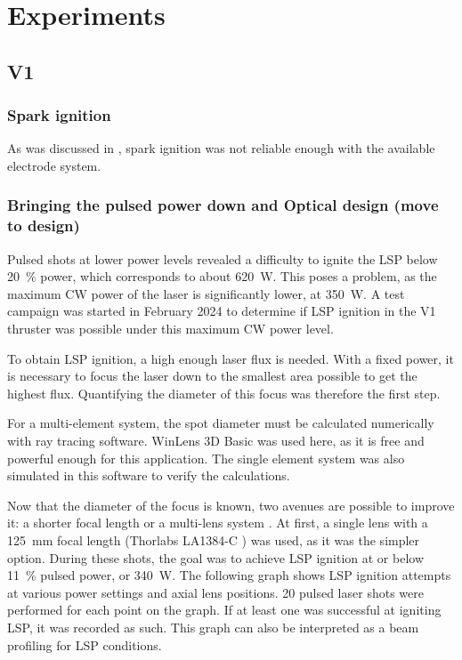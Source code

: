 \chapter{Experiments}

    \section{V1}

        \subsection{Spark ignition}
            
            As was discussed in \cite{duplayArgonLaserPlasmaThruster2024a}, spark ignition was not reliable enough with the available electrode system. 

        \subsection{Bringing the pulsed power down and Optical design (move to design)} \label{sec:design_optics}
            
            Pulsed shots at lower power levels revealed a difficulty to ignite the LSP below \qty{20}{\%} power, which corresponds to about \qty{620}{W}. This poses a problem, as the maximum CW power of the laser is significantly lower, at \qty{350}{W}. A test campaign was started in February 2024 to determine if LSP ignition in the V1 thruster was possible under this maximum CW power level.
            
            To obtain LSP ignition, a high enough laser flux is needed. With a fixed power, it is necessary to focus the laser down to the smallest area possible to get the highest flux. Quantifying the diameter of this focus was therefore the first step. 


            For a multi-element system, the spot diameter must be calculated numerically with ray tracing software. WinLens 3D Basic \cite{winlens} was used here, as it is free and powerful enough for this application. The single element system was also simulated in this software to verify the calculations.

            Now that the diameter of the focus is known, two avenues are possible to improve it: a shorter focal length or a multi-lens system \cite{thorlabs}. At first, a single lens with a \qty{125}{mm} focal length (Thorlabs LA1384-C \cite{125mm lens}) was used, as it was the simpler option. During these shots, the goal was to achieve LSP ignition at or below \qty{11}{\%} pulsed power, or \qty{340}{W}. The following graph shows LSP ignition attempts at various power settings and axial lens positions. 20 pulsed laser shots were performed for each point on the graph. If at least one was successful at igniting LSP, it was recorded as such. This graph can also be interpreted as a beam profiling for LSP conditions.
            
